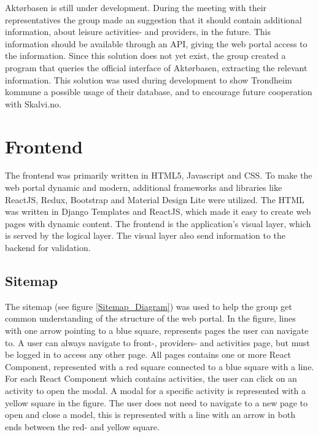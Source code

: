 Aktørbasen is still under development. During the meeting with their representatives the group made an suggestion that it should contain additional information, about leisure activities- and providers, in the future. This information should be available through an API, giving the web portal access to the information. Since this solution does not yet exist, the group created a program that queries the official interface of Aktørbasen, extracting the relevant information. This solution was used during development to show Trondheim kommune a possible usage of their database, and to encourage future cooperation with Skalvi.no. 

\section{Frontend}
The frontend was primarily written in HTML5, Javascript and CSS. To make the web portal dynamic and modern, additional frameworks and libraries like ReactJS, Redux, Bootstrap and Material Design Lite were utilized. The HTML was written in Django Templates and ReactJS, which made it easy to create web pages with dynamic content. The frontend is the application's visual layer, which is served by the logical layer. The visual layer also send information to the backend for validation.


\subsection{Sitemap}
The sitemap (see figure \ref{Sitemap_Diagram}) was used to help the group get common understanding of the structure of the web portal. In the figure, lines with one arrow pointing to a blue square, represents pages the user can navigate to. A user can always navigate to front-, providers- and activities page, but must be logged in to access any other page.
All pages contains one or more React Component, represented with a red square connected to a blue square with a line. For each React Component which contains activities, the user can click on an activity to open the modal. A modal for a specific activity is represented with a yellow square in the figure. The user does not need to navigate to a new page to open and close a model, this is represented with a line with an arrow in both ends between the red- and yellow square.

